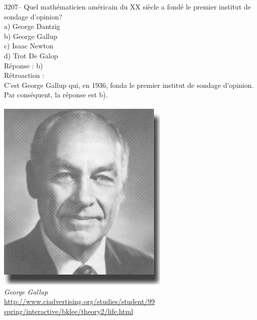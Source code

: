 \documentclass[letterpaper, 12pt]{article}
\begin{document}
3207-- Quel math\'ematicien am\'ericain du {\scriptsize XX\ieme{}} si\`ecle a fond\'e le premier institut de sondage d'opinion?\\

a) George Dantzig\\
b) George Gallup\\
c) Isaac Newton\\
d) Trot De Galop\\

R\'eponse : b)\\

R\'etroaction :\\
C'est George Gallup qui, en 1936, fonda le premier institut de sondage d'opinion. Par cons\'equent, la r\'eponse est b).
\begin{center}
\includegraphics[scale=0.8]{gallup.eps}\\
\emph{{\small George Gallup}}\\
\href{http://www.ciadvertising.org/studies/student/99_spring/interactive/bklee/theory2/life.html}{http://www.ciadvertising.org/studies/student/99 spring/interactive/bklee/theory2/life.html}\\[5mm]
\end{center}
\end{document}
